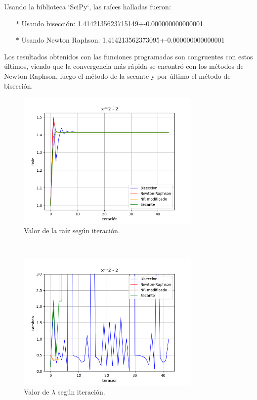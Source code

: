 \documentclass[titlepage,a4paper]{article}
\begin{document}
Usando la biblioteca `SciPy`, las raíces halladas fueron:
\begin{itemize}
    \item[$*$]Usando bisección:  1.4142135623715149+-0.000000000000001
    \item[$*$]Usando Newton Raphson:  1.414213562373095+-0.000000000000001
\end{itemize}

Los resultados obtenidos con las funciones programadas son congruentes con estos últimos, viendo que la convergencia más rápida se encontró con los métodos de Newton-Raphson, luego el método de la secante y por último el método de bisección.

\begin{figure}[H]
\centering
\includegraphics[width=0.8\textwidth]{raiz f1.png}
\caption{\label{fig:class01}Valor de la raíz según iteración.}
\end{figure}
\\
\begin{figure}[H]
\centering
\includegraphics[width=0.8\textwidth]{lambda f1.png}
\caption{\label{fig:class01}Valor de $\lambda$ según iteración.}
\end{figure}
\end{document}
